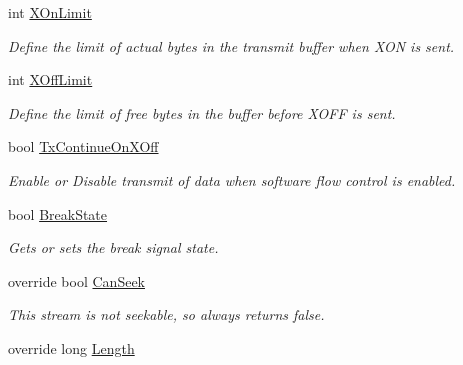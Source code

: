 \begin{DoxyCompactItemize}
int \mbox{\hyperlink{class_r_j_c_p_1_1_i_o_1_1_ports_1_1_serial_port_stream_a9c35bb6f9e65e8a909f7148e6dbcde54}{X\+On\+Limit}}
\begin{DoxyCompactList}\small\item\em Define the limit of actual bytes in the transmit buffer when X\+ON is sent. \end{DoxyCompactList}\item 
int \mbox{\hyperlink{class_r_j_c_p_1_1_i_o_1_1_ports_1_1_serial_port_stream_a788b734b7f7ae0ea73d3d87ddefccb16}{X\+Off\+Limit}}
\begin{DoxyCompactList}\small\item\em Define the limit of free bytes in the buffer before X\+O\+FF is sent. \end{DoxyCompactList}\item 
bool \mbox{\hyperlink{class_r_j_c_p_1_1_i_o_1_1_ports_1_1_serial_port_stream_a7811534e373c98d572fc3eae684abdf1}{Tx\+Continue\+On\+X\+Off}}
\begin{DoxyCompactList}\small\item\em Enable or Disable transmit of data when software flow control is enabled. \end{DoxyCompactList}\item 
bool \mbox{\hyperlink{class_r_j_c_p_1_1_i_o_1_1_ports_1_1_serial_port_stream_aa68ecd352b374f4f0494a4aa22a750fe}{Break\+State}}
\begin{DoxyCompactList}\small\item\em Gets or sets the break signal state. \end{DoxyCompactList}\item 
override bool \mbox{\hyperlink{class_r_j_c_p_1_1_i_o_1_1_ports_1_1_serial_port_stream_a1c2b6dc277a14f084837bc1e12cd4ab8}{Can\+Seek}}
\begin{DoxyCompactList}\small\item\em This stream is not seekable, so always returns false. \end{DoxyCompactList}\item 
override long \mbox{\hyperlink{class_r_j_c_p_1_1_i_o_1_1_ports_1_1_serial_port_stream_a2c6a6e49a6ce101533aea649a76db3a7}{Length}}

\end{DoxyCompactItemize}
